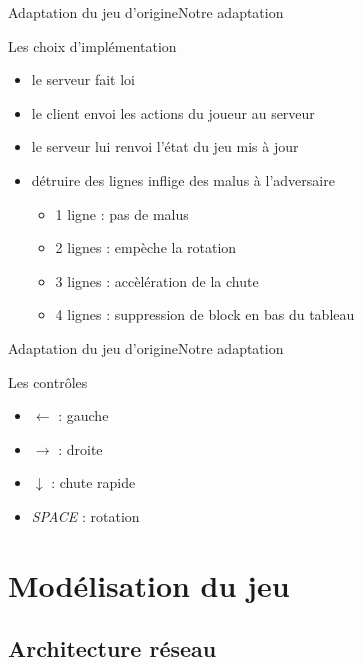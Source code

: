 \documentclass[french]{beamer}
\begin{document}
\begin{frame}{Adaptation du jeu d'origine}{Notre adaptation}
	
	\begin{block}{Les choix d'implémentation}
		\begin{itemize}
			\item le serveur fait loi
			\item le client envoi les actions du joueur au serveur
			\item le serveur lui renvoi l'état du jeu mis à jour
			\item détruire des lignes inflige des malus à l'adversaire
			\begin{itemize}
				\item 1 ligne : pas de malus
				\item 2 lignes : empèche la rotation
				\item 3 lignes : accèlération de la chute
				\item 4 lignes : suppression de block en bas du tableau
			\end{itemize}
		\end{itemize}
	\end{block}


\end{frame}

\begin{frame}{Adaptation du jeu d'origine}{Notre adaptation}
	\begin{block}{Les contrôles}
		\begin{itemize}
			\item $\gets$ : gauche
			\item $\to$ : droite
			\item $\downarrow$ : chute rapide
			\item \emph{SPACE} : rotation
		\end{itemize}
	\end{block}

\end{frame}


\section{Modélisation du jeu}
	\subsection{Architecture réseau}
\end{document}
